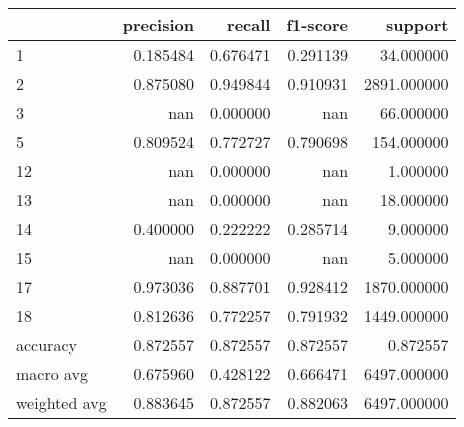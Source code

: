 \begin{tabular}{lrrrr}
\toprule
 & precision & recall & f1-score & support \\
\midrule
1 & 0.185484 & 0.676471 & 0.291139 & 34.000000 \\
2 & 0.875080 & 0.949844 & 0.910931 & 2891.000000 \\
3 & nan & 0.000000 & nan & 66.000000 \\
5 & 0.809524 & 0.772727 & 0.790698 & 154.000000 \\
12 & nan & 0.000000 & nan & 1.000000 \\
13 & nan & 0.000000 & nan & 18.000000 \\
14 & 0.400000 & 0.222222 & 0.285714 & 9.000000 \\
15 & nan & 0.000000 & nan & 5.000000 \\
17 & 0.973036 & 0.887701 & 0.928412 & 1870.000000 \\
18 & 0.812636 & 0.772257 & 0.791932 & 1449.000000 \\
accuracy & 0.872557 & 0.872557 & 0.872557 & 0.872557 \\
macro avg & 0.675960 & 0.428122 & 0.666471 & 6497.000000 \\
weighted avg & 0.883645 & 0.872557 & 0.882063 & 6497.000000 \\
\bottomrule
\end{tabular}
